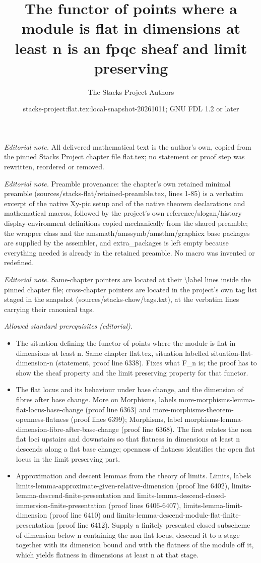 \documentclass[10pt,a4paper]{amsart}
\title{The functor of points where a module is flat in dimensions at least n is an fpqc sheaf and limit preserving}
\author{The Stacks Project Authors}
\date{stacks-project:flat.tex:local-snapshot-20261011; GNU FDL 1.2 or later}
\theoremstyle{plain}
\theoremstyle{definition}
\theoremstyle{remark}
\numberwithin{equation}{subsection}
\begin{document}
\maketitle
\noindent\textit{Editorial note.} All delivered mathematical text is the author's own, copied from the pinned Stacks Project chapter file flat.tex; no statement or proof step was rewritten, reordered or removed.\par\medskip
\noindent\textit{Editorial note.} Preamble provenance: the chapter's own retained minimal preamble (sources/stacks-flat/retained-preamble.tex, lines 1-85) is a verbatim excerpt of the native Xy-pic setup and of the native theorem declarations and mathematical macros, followed by the project's own reference/slogan/history display-environment definitions copied mechanically from the shared preamble; the wrapper class and the amsmath/amssymb/amsthm/graphicx base packages are supplied by the assembler, and extra\_packages is left empty because everything needed is already in the retained preamble. No macro was invented or redefined.\par\medskip
\noindent\textit{Editorial note.} Same-chapter pointers are located at their \textbackslash{}label lines inside the pinned chapter file; cross-chapter pointers are located in the project's own tag list staged in the snapshot (sources/stacks-chow/tags.txt), at the verbatim lines carrying their canonical tags.\par\medskip
\noindent\textit{Allowed standard prerequisites (editorial).}\begin{itemize}
\item The situation defining the functor of points where the module is flat in dimensions at least n. Same chapter flat.tex, situation labelled situation-flat-dimension-n (statement, proof line 6338). Fixes what F\_n is; the proof has to show the sheaf property and the limit preserving property for that functor.
\item The flat locus and its behaviour under base change, and the dimension of fibres after base change. More on Morphisms, labels more-morphisms-lemma-flat-locus-base-change (proof line 6363) and more-morphisms-theorem-openness-flatness (proof lines 6399); Morphisms, label morphisms-lemma-dimension-fibre-after-base-change (proof line 6368). The first relates the non flat loci upstairs and downstairs so that flatness in dimensions at least n descends along a flat base change; openness of flatness identifies the open flat locus in the limit preserving part.
\item Approximation and descent lemmas from the theory of limits. Limits, labels limits-lemma-approximate-given-relative-dimension (proof line 6402), limits-lemma-descend-finite-presentation and limits-lemma-descend-closed-immersion-finite-presentation (proof lines 6406-6407), limits-lemma-limit-dimension (proof line 6410) and limits-lemma-descend-module-flat-finite-presentation (proof line 6412). Supply a finitely presented closed subscheme of dimension below n containing the non flat locus, descend it to a stage together with its dimension bound and with the flatness of the module off it, which yields flatness in dimensions at least n at that stage.
\end{itemize}\medskip
\end{document}
